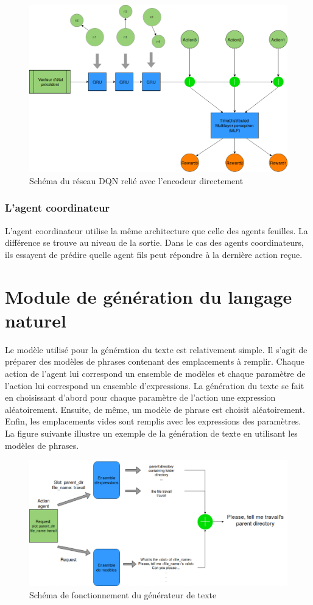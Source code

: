 \begin{figure}[H] 
	\centering
	\includegraphics[width=0.88\linewidth]{images/Conception/DM/encoder_dqn.png}
	\caption{Schéma du réseau DQN relié avec l'encodeur directement}
\end{figure}\label{encoder_dqn}
\subsubsection*{L'agent coordinateur}
L'agent coordinateur utilise la même architecture que celle des agents feuilles. La différence se trouve au niveau de la sortie. Dans le cas des agents coordinateurs, ils essayent de prédire quelle agent fils peut répondre à la dernière action reçue.
\section{Module de génération du langage naturel}
Le modèle utilisé pour la génération du texte est relativement simple. Il s'agit de préparer des modèles de phrases contenant des emplacements à remplir. Chaque action de l'agent lui correspond un ensemble de modèles et chaque paramètre de l'action lui correspond un ensemble d'expressions. La génération du texte se fait en choisissant d'abord pour chaque paramètre de l'action une expression aléatoirement. Ensuite, de même, un modèle de phrase est choisit aléatoirement. Enfin, les emplacements vides sont remplis avec les expressions des paramètres. La figure suivante illustre un exemple de la génération de texte en utilisant les modèles de phrases.
\begin{figure}[H] 
	\centering
	\includegraphics[width=0.95\linewidth]{images/Conception/NLG.png}
	\caption{Schéma de fonctionnement du générateur de texte}
\end{figure}\label{nlg_schema}

